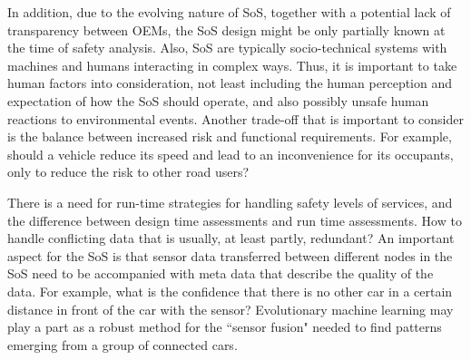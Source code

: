 In addition, due to the evolving nature of SoS, together with a potential lack of transparency between OEMs, the SoS design might be only partially known at the time of safety analysis. Also, SoS are typically socio-technical systems with  machines and humans interacting in complex ways. Thus, it is important to take human factors into consideration, not least including the human perception and expectation of how the SoS should operate, and also possibly unsafe human reactions to environmental events. Another trade-off that is important to consider is the balance between increased risk and functional requirements. For example, should a vehicle reduce its speed and lead to an inconvenience for its occupants, only to reduce the risk to other road users? 




There is a need for run-time strategies for handling safety levels of services, and the difference between design time assessments and run time assessments. How to handle conflicting data that is usually, at least partly, redundant? An important aspect for the SoS is that sensor data transferred between different nodes in the SoS need to be accompanied with meta data that describe the quality of the data. For example, what is the confidence that there is no other car in a certain distance in front of the car with the sensor? Evolutionary machine learning may play a part as a robust method for the ``sensor fusion" needed to find patterns emerging from a group of connected cars.


